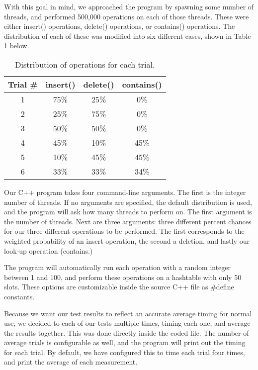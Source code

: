 \documentclass[journal]{IEEEtran}
\begin{document}
With this goal in mind, we approached the program by spawning some number of threads, and performed 500,000 operations on each of those threads. These were either insert() operations, delete() operations, or contains() operations. The distribution of each of these was modified into six different cases, shown in Table 1 below.

\begin{table}[h]
\centering
\begin{center}
\begin{tabular}{ |c|c|c|c| } 
 \hline
 Trial \# & insert() & delete() & contains() \\ 
 \hline
 1 & 75\% & 25\% & 0\% \\ 
 2 & 25\% & 75\% & 0\% \\ 
 3 & 50\% & 50\% & 0\% \\ 
 4 & 45\% & 10\% & 45\% \\ 
 5 & 10\% & 45\% & 45\% \\ 
 6 & 33\% & 33\% & 34\% \\ 
 \hline
\end{tabular}
\end{center}
\caption{Distribution of operations for each trial.}
\end{table}


Our C++ program takes four command-line arguments. The first is the integer number of threads. If no arguments are specified, the default distribution is used, and the program will ask how many threads to perform on. The first argument is the number of threads. Next are three arguments: three different percent chances for our three different operations to be performed. The first corresponds to the weighted probability of an insert operation, the second a deletion, and lastly our look-up operation (contains.)

The program will automatically run each operation with a random integer between 1 and 100, and perform these operations on a hashtable with only 50 slots. These options are customizable inside the source C++ file as \#define constants.

Because we want our test results to reflect an accurate average timing for normal use, we decided to each of our tests multiple times, timing each one, and average the results together. This was done directly inside the coded file. The number of average trials is configurable as well, and the program will print out the timing for each trial. By default, we have configured this to time each trial four times, and print the average of each measurement.
\end{document}
